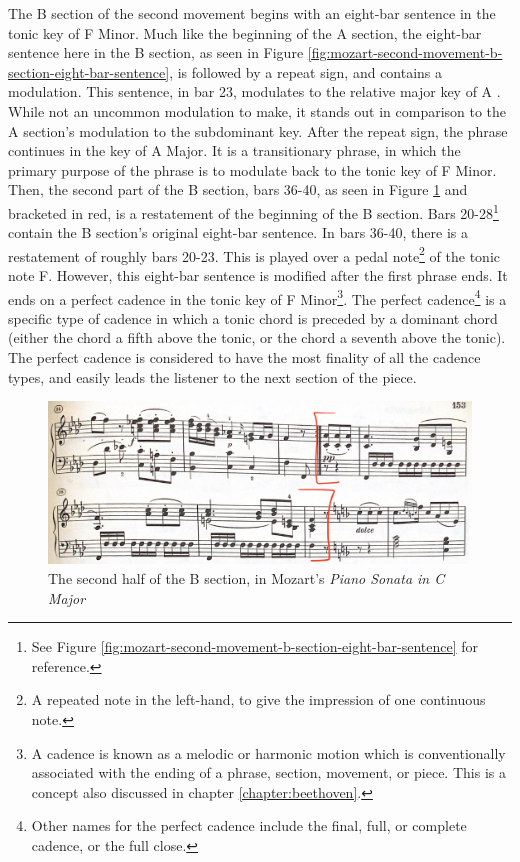 The B section of the second movement begins with an eight-bar sentence in the tonic key of F Minor. Much like the beginning of the A section, the eight-bar sentence here in the B section, as seen in Figure \ref{fig:mozart-second-movement-b-section-eight-bar-sentence}\autocite{Henle_1977}, is followed by a repeat sign, and contains a modulation. This sentence, in bar 23, modulates to the relative major key of A \musFlat{}. While not an uncommon modulation to make, it stands out in comparison to the A section's modulation to the subdominant key. After the repeat sign, the phrase continues in the key of A\musFlat{} Major. It is a transitionary phrase, in which the primary purpose of the phrase is to modulate back to the tonic key of F Minor. Then, the second part of the B section, bars 36-40, as seen in Figure \ref{fig:mozart-second-movement-second-half-b-section}\autocite{Henle_1977} and bracketed in red, is a restatement of the beginning of the B section. Bars 20-28\footnote{See Figure \ref{fig:mozart-second-movement-b-section-eight-bar-sentence} for reference.} contain the B section's original eight-bar sentence. In bars 36-40, there is a restatement of roughly bars 20-23. This is played over a pedal note\footnote{A repeated note in the left-hand, to give the impression of one continuous note.} of the tonic note F. However, this eight-bar sentence is modified after the first phrase ends. It ends on a perfect cadence\autocite{Nagley_Whittall_2011} in the tonic key of F Minor\footnote{A cadence is known as a melodic or harmonic motion which is conventionally associated with the ending of a phrase, section, movement, or piece. This is a concept also discussed in chapter \ref{chapter:beethoven}.}. The perfect cadence\footnote{Other names for the perfect cadence include the final, full, or complete cadence, or the full close.} is a specific type of cadence in which a tonic chord is preceded by a dominant chord (either the chord a fifth above the tonic, or the chord a seventh above the tonic). The perfect cadence is considered to have the most finality of all the cadence types, and easily leads the listener to the next section of the piece.

\begin{figure}
	\centering
	\includegraphics[width=\textwidth]{figures/mozart-second-movement-second-half-b-section.jpg}
	\caption{The second half of the B section, in Mozart's \textit{Piano Sonata in C Major}}
	\label{fig:mozart-second-movement-second-half-b-section}
\end{figure}

